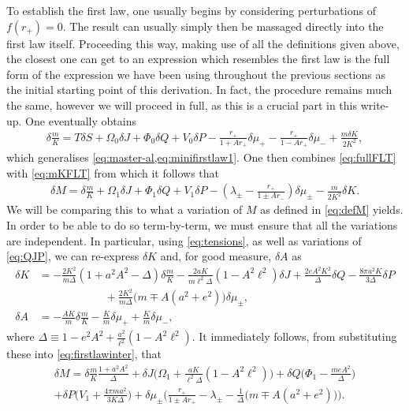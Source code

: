 \documentclass[
twoside,
openright,
frontopenright,
]{dmathesis}
\newcommand{\nn}{\nonumber}
\begin{document}
To establish the first law, one usually begins by considering perturbations of
$f(r_+)=0$. The result can usually simply then be massaged directly into the
first law itself. Proceeding this way, making use of all the definitions given
above, the closest one can get to an expression which resembles the first law is
the full form of the expression we have been using throughout the previous
sections as the initial starting point of this derivation. In fact, the
procedure remains much the same, however we will proceed in full, as this is a
crucial part in this write-up. One eventually obtains
\begin{align}\label{eq:mKFLT}
\delta \frac{m}{K} = T\delta S + \Omega_0 \delta J + \Phi_0 \delta Q + V_0
  \delta P - \frac{r_+}{1+Ar_+} \delta \mu_+ - \frac{r_+}{1-Ar_+}\delta \mu_-
  +\frac{m\delta K}{2K^2},
\end{align}
which generalises \cref{eq:master-al,eq:minifirstlaw1}. One then combines
\cref{eq:fullFLT} with \cref{eq:mKFLT} from which it follows that
\begin{align}\label{eq:firstlawinter}
\delta M = \delta \frac{m}{K} + \Omega_1 \delta J + \Phi_1 \delta Q + V_1 \delta
  P - \left(\lambda_\pm - \frac{r_+}{1\pm Ar_-}\right) \delta \mu_\pm -
  \frac{m}{2K^2}\delta K. 
\end{align}
We will be comparing this to what a variation of $M$ as defined in
\cref{eq:defM} yields. In order to be able to do so term-by-term, we must ensure
that all the variations are independent. In particular, using
\cref{eq:tensions}, as well as variations of \cref{eq:QJP}, we can re-express
$\delta K$ and, for good measure, $\delta A$ as
\begin{align}
\delta K &=-\frac{2K^2}{m\Delta}(1+a^2A^2-\Delta) \delta \frac{m}{K} -
           \frac{2aK}{m\ell^2\Delta}(1-A^2\ell^2)\delta
           J+\frac{2eA^2K^2}{\Delta}\delta Q-\frac{8\pi a^2K}{3\Delta}\delta P \nn\\ 
&\qquad\qquad\qquad +\frac{2K^2}{m\Delta}\big(m\mp A(a^2+e^2)\big)\delta\mu_\pm,
                     \nn\\ 
\delta A &=-\frac{A K}{m}\delta\frac{m}{K}-\frac{K}{m}\delta\mu_+ +
           \frac{K}{m}\delta \mu_-,
\label{eq:dKdA}
\end{align}
where $\Delta \equiv 1-e^2A^2+\frac{a^2}{\ell^2}(1-A^2\ell^2) $. It immediately follows, from substituting these into \cref{eq:firstlawinter},
that
\begin{multline}
\delta M = \delta\frac{m}{K} \frac{1+a^2A^2}{\Delta} 
+\delta J \bigg(\Omega_1+\frac{aK}{\ell^2\Delta}(1-A^2\ell^2)\bigg) 
+\delta Q \bigg(\Phi_1-\frac{meA^2}{\Delta}\bigg) \\
+\delta P \Big(V_1+\frac{4\pi ma^2}{3K\Delta}\Big) 
+\delta \mu_\pm \Big(\frac{r_+}{1\pm Ar_+}-\lambda_\pm
-\frac{1}{\Delta}\big(m\mp A(a^2+e^2)\big)\Big).
\label{eq:dM1}
\end{multline}
\end{document}
